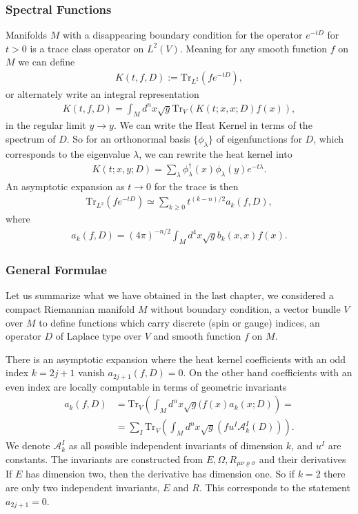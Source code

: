 \subsubsection{Spectral Functions}
Manifolds $M$ with a disappearing boundary condition for the operator $e^{-tD}$ for $t>0$ is a
trace class operator on $L^2(V)$. Meaning for any smooth function $f$ on $M$
we can define
\begin{align}
    K(t,f,D) := \text{Tr}_{L^2}(fe^{-tD}),
\end{align}
or alternately write an integral representation
\begin{align}
    K(t, f, D) = \int_M d^n x \sqrt{g} \text{Tr}_V(K(t;x,x;D)f(x)),
\end{align}
in the regular limit $y\rightarrow y$. We can write the Heat Kernel in terms
of the spectrum of $D$. So for an orthonormal basis $\{\phi_\lambda\}$ of
eigenfunctions for $D$, which corresponds to the eigenvalue $\lambda$, we
can rewrite the heat kernel into
\begin{align}
    K(t;x,y;D) = \sum_\lambda \phi^\dagger_\lambda(x)
    \phi_\lambda(y)e^{-t\lambda}.
\end{align}
An asymptotic expansion as $t \rightarrow 0$ for the trace is then
\begin{align}
    \text{Tr}_{L^2}(fe^{-tD}) \simeq \sum_{k\geq 0}t^{(k-n)/2}a_k(f,D),
\end{align}
where
\begin{align}
    a_k(f,D) = (4\pi)^{-n/2} \int_M d^4x \sqrt{g} b_k(x,x) f(x).
\end{align}
\subsubsection{General Formulae}
Let us summarize what we have obtained in the last chapter, we considered a
compact Riemannian manifold $M$ without boundary condition, a vector bundle
$V$ over $M$ to define functions which carry discrete (spin or gauge)
indices, an operator $D$ of Laplace type over $V$ and smooth function $f$ on
$M$.

There is an asymptotic expansion where the heat kernel coefficients with an
odd index $k=2j+1$ vanish $a_{2j+1}(f,D) = 0$. On the other hand coefficients
with an even index are locally computable in terms of geometric invariants
\begin{align}
    a_k(f,D) &= \text{Tr}_V\left(\int_M d^n x\sqrt{g}(f(x)a_k(x;D)\right) =\\
    &=\sum_I \text{Tr}_V\left(\int_M d^nx \sqrt{g}(fu^I
    \mathcal{A}^I_k(D))\right).
\end{align}
We denote $\mathcal{A}^I_k$ as all possible independent invariants of
dimension $k$, and $u^I$ are constants. The invariants are constructed from
$E, \Omega, R_{\mu\nu\varrho\sigma}$ and their derivatives If $E$ has
dimension two, then the derivative has dimension one. So if $k=2$ there are
only two independent invariants, $E$ and $R$. This corresponds to the
statement $a_{2j+1}=0$.

